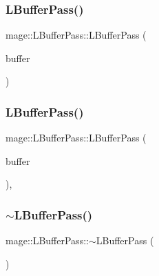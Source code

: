 \hypertarget{classmage_1_1_l_buffer_pass_a0cd35fd1ded3c17d04c1689d1e30e476}{}\label{classmage_1_1_l_buffer_pass_a0cd35fd1ded3c17d04c1689d1e30e476} 
\subsubsection{\texorpdfstring{L\+Buffer\+Pass()}{LBufferPass()}\hspace{0.1cm}{\footnotesize\ttfamily [2/3]}}
{\footnotesize\ttfamily mage\+::\+L\+Buffer\+Pass\+::\+L\+Buffer\+Pass (\begin{DoxyParamCaption}\item[{const \hyperlink{classmage_1_1_l_buffer_pass}{L\+Buffer\+Pass} \&}]{buffer }\end{DoxyParamCaption})\hspace{0.3cm}{\ttfamily [delete]}}

\hypertarget{classmage_1_1_l_buffer_pass_ae68baaaa3fee2a76d64037f58d3e389b}{}\label{classmage_1_1_l_buffer_pass_ae68baaaa3fee2a76d64037f58d3e389b} 
\subsubsection{\texorpdfstring{L\+Buffer\+Pass()}{LBufferPass()}\hspace{0.1cm}{\footnotesize\ttfamily [3/3]}}
{\footnotesize\ttfamily mage\+::\+L\+Buffer\+Pass\+::\+L\+Buffer\+Pass (\begin{DoxyParamCaption}\item[{\hyperlink{classmage_1_1_l_buffer_pass}{L\+Buffer\+Pass} \&\&}]{buffer }\end{DoxyParamCaption})\hspace{0.3cm}{\ttfamily [default]}, {\ttfamily [noexcept]}}

\hypertarget{classmage_1_1_l_buffer_pass_ae9bad6fa2eb3827f9e28a3f21a974496}{}\label{classmage_1_1_l_buffer_pass_ae9bad6fa2eb3827f9e28a3f21a974496} 
\subsubsection{\texorpdfstring{$\sim$\+L\+Buffer\+Pass()}{~LBufferPass()}}
{\footnotesize\ttfamily mage\+::\+L\+Buffer\+Pass\+::$\sim$\+L\+Buffer\+Pass (\begin{DoxyParamCaption}{ }\end{DoxyParamCaption})\hspace{0.3cm}{\ttfamily [default]}}



